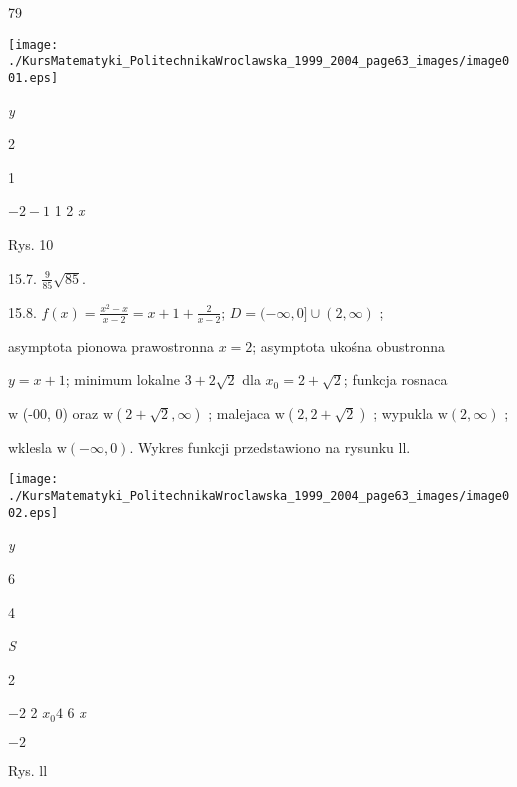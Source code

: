 \documentclass[a4paper,12pt]{article}
\begin{document}
79
\begin{center}
\texttt{[image: ./KursMatematyki\_PolitechnikaWroclawska\_1999\_2004\_page63\_images/image001.eps]}
\end{center}
{\it y}

2

1

$-2  -1$  1 2  {\it x}

Rys. 10

15.7. $\displaystyle \frac{9}{85}\sqrt{85}.$

15.8. $f(x) = \displaystyle \frac{x^{2}-x}{x-2} = x+ 1 + \displaystyle \frac{2}{x-2}$; $D = (-\infty,0]\cup(2,\infty)$ ;

asymptota pionowa prawostronna $x = 2$; asymptota ukośna obustronna

$y = x+1$; minimum lokalne $3+2\sqrt{2}$ dla $x_{0} = 2+\sqrt{2}$; funkcja rosnaca

$\mathrm{w}$ (-00, 0) oraz $\mathrm{w}(2+\sqrt{2},\infty)$ ; malejaca $\mathrm{w}(2,2+\sqrt{2})$ ; wypukla $\mathrm{w}(2,\infty)$ ;

wklesla $\mathrm{w}(-\infty,0)$. Wykres funkcji przedstawiono na rysunku ll.
\begin{center}
\texttt{[image: ./KursMatematyki\_PolitechnikaWroclawska\_1999\_2004\_page63\_images/image002.eps]}
\end{center}
{\it y}

6

4

{\it S}

2

$-2$  2 $x_{0}4$ 6  {\it x}

$-2$

Rys. ll
\end{document}
